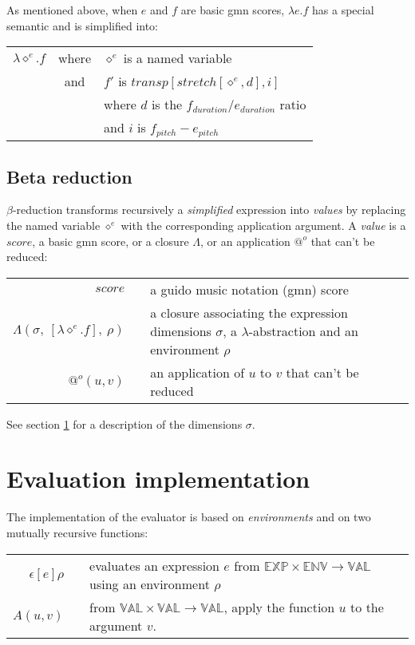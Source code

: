 \documentclass[10pt,a4paper,frenchb]{article}
\makeatletter
\newcommand{\var}[1]		{\ensuremath{\diamond^#1}}
\newcommand{\expr}		{\ensuremath{\mathbb{EXP}}}
\newcommand{\val}		{\ensuremath{\mathbb{VAL}}}
\newcommand{\env}		{\ensuremath{\mathbb{ENV}}}
\newcommand{\clossym}	{\ensuremath{\Lambda}}
\newcommand{\applyop}	{\ensuremath{@}}
\newcommand{\noredex}	{\ensuremath{\applyop^o}}
\newcommand{\sdomain}[3]{$#1 \times #2 \rightarrow #3$}
\newcommand{\evalsym}			{\ensuremath{\epsilon}}
\newcommand{\envsym}				{\ensuremath{\rho}}
\newcommand{\closure}[4]			{\ensuremath{\clossym\left(#4,\ \left[\lambdaexpr{#1}{#2}\right],\ #3 \right)}}
\newcommand{\evalsimple}[2][\envsym]	{\ensuremath{\evalsym\left[#2\right]#1}}
\newcommand{\lambdaexpr}[2]	{\lambda \var{#1}.#2}
\newcommand{\bounds}			{\ensuremath{\sigma}}
\makeatother
\begin{document}
As mentioned above, when $e$ and $f$ are basic gmn scores, $\lambda e.f$ has a special semantic and is simplified into: 
\begin{tabular}{rcl}
 $\lambdaexpr{e}{f}$ & where & $\var{e}$ is a named variable \\
 	& and & $f'$ is $transp[stretch[\var{e}, d], i]$ \\
 	&  & where $d$ is the $f_{duration} / e_{duration}$ ratio \\
 	&  & and $i$ is $f_{pitch} - e_{pitch}$ \\
\end{tabular}


\subsection{Beta reduction}

$\beta$-reduction transforms recursively a \emph{simplified} expression into \emph{values} by replacing the named variable $\var{e}$ with the corresponding application argument. A \emph{value} is a $score$, a basic gmn score, or a closure $\clossym$, or an application $\noredex$ that can't be reduced:
\begin{center}
\begin{tabular}{rc@{ : }l}
 $score$				& & a guido music notation (gmn) score \\
 $\closure{e}{f}{\envsym}{\bounds}$  & & a closure associating the expression dimensions $\bounds$, a $\lambda$-abstraction and an environment $\envsym$ \\
 $\noredex(u,v)$ 		& & an application of $u$ to $v$ that can't be reduced \\
\end{tabular}
\end{center}

See section \ref{impl} for a description of the dimensions $\bounds$.

\section{Evaluation implementation}
\label{impl}

The implementation of the evaluator is based on \emph{environments} and on two mutually recursive functions:
\begin{center}
\begin{tabular}{rc@{ : }l}
$\evalsimple{e}$ & & evaluates an expression $e$ from \sdomain{\expr}{\env}{\val} using an environment $\envsym$ \\
$A(u,v)$  & & from \sdomain{\val}{\val}{\val}, apply the function $u$ to the argument $v$. \\
\end{tabular}
\end{center}
\end{document}
